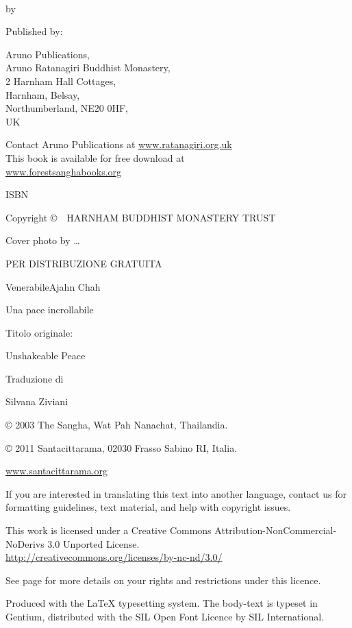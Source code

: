 {\small\setlength{\parskip}{0.8em}\setlength{\parindent}{0em}%
{\raggedright%

\thetitle\\
by \theauthor

Published by:

Aruno Publications,\\
Aruno Ratanagiri Buddhist Monastery,\\
2 Harnham Hall Cottages,\\
Harnham, Belsay,\\
Northumberland, NE20 0HF,\\
UK

Contact Aruno Publications at \href{http://ratanagiri.org.uk}{www.ratanagiri.org.uk}\\
This book is available for free download at\\
\href{http://forestsanghabooks.org/}{www.forestsanghabooks.org}

ISBN \theISBN

Copyright \copyright\ \the\year\ HARNHAM BUDDHIST MONASTERY TRUST

Cover photo by \ldots

PER DISTRIBUZIONE GRATUITA

VenerabileAjahn Chah

Una pace incrollabile

Titolo originale:

Unshakeable Peace

Traduzione di

Silvana Ziviani

© 2003 The Sangha, Wat Pah Nanachat, Thailandia.

© 2011 Santacittarama, 02030 Frasso Sabino RI, Italia.

\href{http://www.santacittarama.org/}{www.santacittarama.org}

\vfill

{\footnotesize
If you are interested in translating this text into another language, contact us for formatting guidelines, text material, and help with copyright issues.

This work is licensed under a Creative Commons Attribution-NonCommercial-NoDerivs 3.0 Unported License.\\
\href{http://creativecommons.org/licenses/by-nc-nd/3.0/}{http://creativecommons.org/licenses/by-nc-nd/3.0/}

See page \pageref{copyright-details} for more details on your rights and restrictions under this licence.

Produced with the {\selectfont\LaTeX} typesetting system. The body-text is typeset in Gentium, distributed with the SIL Open Font Licence by SIL International.

\theEditionInfo

\thePrintedByInfo

}

}}

